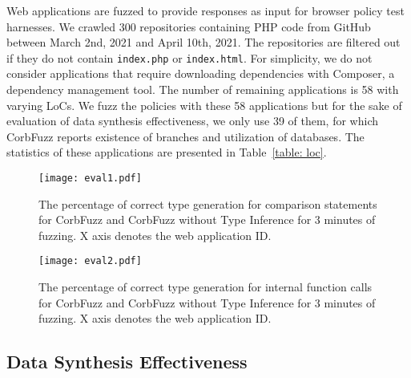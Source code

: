 \documentclass[10pt,conference]{IEEEtran}
\begin{document}
Web applications are fuzzed to provide responses as input for browser policy test harnesses. We crawled 300 repositories containing PHP code from GitHub between March 2nd, 2021 and April 10th, 2021. The repositories are filtered out if they do not contain \verb|index.php| or \verb|index.html|. For simplicity, we do not consider applications that require downloading dependencies with Composer\cite{noauthor_composer_nodate}, a dependency management tool.  %
The number of remaining applications is 58 with varying LoCs. We fuzz the policies with these 58 applications but for the sake of evaluation of data synthesis effectiveness, we only use 39 of them, for which CorbFuzz reports existence of branches and utilization of databases. The statistics of these applications are presented in Table~\ref{table: loc}.


\begin{figure} [t] \small
\hspace*{-9mm}
    \centering
    \texttt{[image: eval1.pdf]}
    \caption{The percentage of correct type generation for comparison statements for CorbFuzz and CorbFuzz without Type Inference for 3 minutes of fuzzing. X axis denotes the web application ID.}
    \label{fig:type-gen-comp}
\end{figure}

\begin{figure} [t] \small
\hspace*{-9mm}
    \centering
    \texttt{[image: eval2.pdf]}
    \caption{The percentage of correct type generation for internal function calls for CorbFuzz and CorbFuzz without Type Inference for 3 minutes of fuzzing. X axis denotes the web application ID.}
    \label{fig:type-gen-fn}

\end{figure}

\subsection{Data Synthesis Effectiveness}
\label{subsec:eval-data-synthesis}
\end{document}
